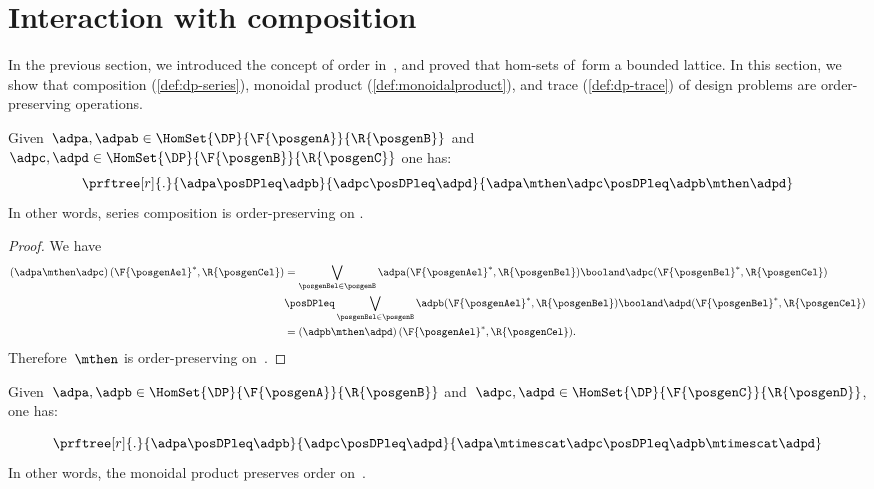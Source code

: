 

\section{Interaction with composition}
In the previous section, we introduced the concept of order in~\DP, and proved that hom-sets of~\DP form a bounded lattice.
In this section, we show that composition (\cref{def:dp-series}), monoidal product (\cref{def:monoidalproduct}), and trace (\cref{def:dp-trace}) of design problems are order-preserving operations.

\begin{lemma}
    \label{lem:series_pres_order}
    Given~$\adpa,\adpab \in \HomSet{\DP}{\F{\posgenA}}{\R{\posgenB}}$ and~$\adpc,\adpd \in \HomSet{\DP}{\F{\posgenB}}{\R{\posgenC}}$ one has:
    \begin{equation}
        \prftree[r]{.}{\adpa\posDPleq \adpb}{\adpc\posDPleq \adpd}{\adpa\mthen \adpc \posDPleq \adpb\mthen \adpd}
    \end{equation}
    In other words, series composition is order-preserving on \DP.
\end{lemma}

\begin{proof}
    We have
    \begin{equation}
        \label{eq:series_pres_ord}
        \begin{aligned}
            \left( \adpa\mthen \adpc\right)(\F{\posgenAel}^*,\R{\posgenCel})&=
            \bigvee_{\posgenBel\in \posgenB}\adpa(\F{\posgenAel}^*,\R{\posgenBel})\booland \adpc(\F{\posgenBel}^*,\R{\posgenCel})\\
            &\posDPleq \bigvee_{\posgenBel\in \posgenB} \adpb(\F{\posgenAel}^*,\R{\posgenBel})\booland \adpd(\F{\posgenBel}^*,\R{\posgenCel})\\
            &=\left( \adpb\mthen \adpd\right)(\F{\posgenAel}^*,\R{\posgenCel}).
        \end{aligned}
    \end{equation}
    Therefore~$\mthen$ is order-preserving on~\DP.
\end{proof}

\begin{lemma}
    \label{lem:tens_pres_order}
    Given~$\adpa,\adpb \in \HomSet{\DP}{\F{\posgenA}}{\R{\posgenB}}$ and~$\adpc,\adpd \in \HomSet{\DP}{\F{\posgenC}}{\R{\posgenD}}$, one has:
    
    \begin{equation}
        \prftree[r]{.}{\adpa\posDPleq \adpb}{\adpc\posDPleq \adpd}{\adpa\mtimescat \adpc \posDPleq \adpb\mtimescat \adpd}
    \end{equation}
    In other words, the monoidal product preserves order on~\DP.
\end{lemma}

